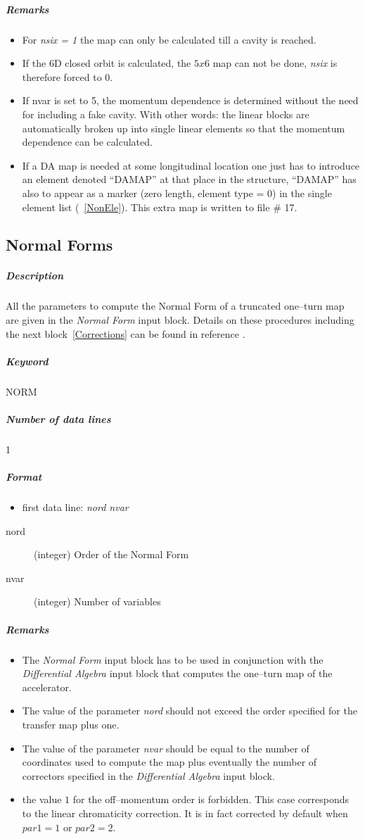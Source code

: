 \subparagraph{Remarks}
\begin{itemize}
\item For {\em nsix = 1} \/the map can only be calculated till a
  cavity is reached.
\item If the 6D closed orbit is calculated, the $ 5x6 $ map can not be
  done, {\em nsix} \/is therefore forced to 0.
\item If nvar is set to 5, the momentum dependence is determined
  without the need for including a fake cavity. With other words: the
  linear blocks are automatically broken up into single linear
  elements so that the momentum dependence can be calculated.
\item If a DA map is needed at some longitudinal location one just has
  to introduce an element denoted ``DAMAP'' at that place in the
  structure, ``DAMAP'' has also to appear as a marker (zero length,
  element type = 0) in the single element list (~\ref{NonEle}).  This
  extra map is written to file \# 17.
\end{itemize}

\subsection{Normal Forms} \label{Normal}

\subparagraph{Description} All the parameters to compute the Normal
Form of a truncated one--turn map are given in the {\em Normal Form }
\/input block. Details on these procedures including the next
block~\ref{Corrections} can be found in reference \cite{Massimo}.

\subparagraph{Keyword} NORM \subparagraph{Number of data lines} 1

\subparagraph{Format}
\begin{itemize}
\item first data line: {\em nord nvar}
\end{itemize}

\begin{description}
\item [nord] (integer) Order of the Normal Form
\item [nvar] (integer) Number of variables
\end{description}

\subparagraph{Remarks}
\begin{itemize}
\item The {\em Normal Form } \/input block has to be used in
  conjunction with the {\em Differential Algebra } \/input block that
  computes the one--turn map of the accelerator.
\item The value of the parameter {\em nord} \/should not exceed the
  order specified for the transfer map plus one.
\item The value of the parameter {\em nvar} \/should be equal to the
  number of coordinates used to compute the map plus eventually the
  number of correctors specified in the {\em Differential Algebra }
  \/input block.
\item the value $1$ for the off--momentum order is forbidden. This
  case corresponds to the linear chromaticity correction. It is in
  fact corrected by default when $par1 =1$ or $par2 =2$.
\end{itemize}

